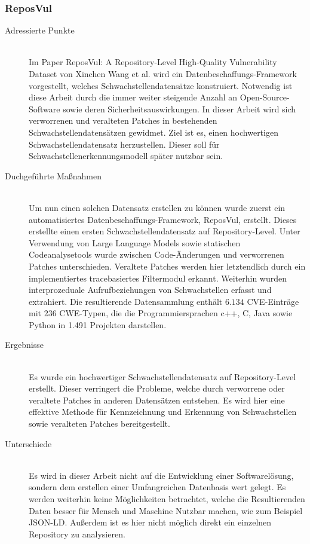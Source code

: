 \subsubsection{ReposVul} \label{sec:ReposVul}
    \begin{description}
        \item[Adressierte Punkte]\hfill \\
            Im Paper \glqq ReposVul: A Repository-Level High-Quality Vulnerability Dataset\grqq\cite{article:wang2024reposvul} von Xinchen Wang et al. wird ein Datenbeschaffungs-Framework vorgestellt, welches Schwachstellendatensätze konstruiert.
            Notwendig ist diese Arbeit durch die immer weiter steigende Anzahl an Open-Source-Software sowie deren Sicherheitsauswirkungen.
            In dieser Arbeit wird sich verworrenen und veralteten Patches in bestehenden Schwachstellendatensätzen gewidmet.
            Ziel ist es, einen hochwertigen Schwachstellendatensatz herzustellen.
            Dieser soll für Schwachstellenerkennungsmodell später nutzbar sein.
        \item[Duchgeführte Maßnahmen]\hfill \\
            Um nun einen solchen Datensatz erstellen zu können wurde zuerst ein automatisiertes Daten\-be\-schaffungs-Framework, \glqq ReposVul\grqq, erstellt.
            Dieses erstellte einen ersten Schwachstellendatensatz auf Repository-Level.
            Unter Verwendung von Large Language Models sowie statischen Codeanalysetools wurde zwischen Code-Änderungen und verworrenen Patches unterschieden.
            Veraltete Patches werden hier letztendlich durch ein implementiertes tracebasiertes Filtermodul erkannt.
            Weiterhin wurden interprozeduale Aufrufbeziehungen von Schwachstellen erfasst und extrahiert.
            Die resultierende Datensammlung enthält $6.134$ CVE-Einträge mit $236$ CWE-Typen, die die Programmiersprachen c++, C, Java sowie Python in 1.491 Projekten darstellen.
        \item[Ergebnisse]\hfill \\
            Es wurde ein hochwertiger Schwachstellendatensatz auf Repository-Level erstellt.
            Dieser verringert die Probleme, welche durch verworrene oder veraltete Patches in anderen Datensätzen entstehen.
            Es wird hier eine effektive Methode für Kennzeichnung und Erkennung von Schwachstellen sowie veralteten Patches bereitgestellt.
        \item[Unterschiede]\hfill \\
            Es wird in dieser Arbeit nicht auf die Entwicklung einer Softwarelösung, sondern dem erstellen einer Umfangreichen Datenbasis wert gelegt.
            Es werden weiterhin keine Möglichkeiten betrachtet, welche die Resultierenden Daten besser für Mensch und Maschine Nutzbar machen, wie zum Beispiel \ac{JSON-LD}.
            Außerdem ist es hier nicht möglich direkt ein einzelnen Repository zu analysieren.
    \end{description}